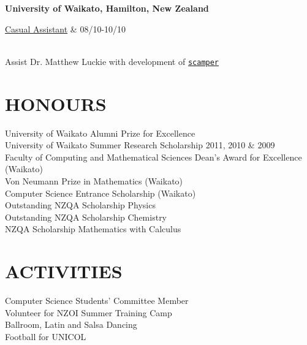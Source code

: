 \documentclass[margin,11pt]{res} %
\begin{document}
\begin{resume}
                {\bf University of Waikato, Hamilton, New Zealand} \\
                \begin{ncolumn}{2} %
                \underline{Casual Assistant} &   08/10-10/10
                \end{ncolumn} \\
                Assist Dr. Matthew Luckie with development of
                \href{http://www.wand.net.nz/scamper}{\tt{scamper}}


\section{HONOURS}
				University of Waikato Alumni Prize for Excellence \\
				University of Waikato Summer Research Scholarship 2011, 2010 \& 2009 \\
				Faculty of Computing and Mathematical Sciences Dean's Award for Excellence (Waikato) \\
				Von Neumann Prize in Mathematics (Waikato) \\
				Computer Science Entrance Scholarship (Waikato) \\
				Outstanding NZQA Scholarship Physics \\
				Outstanding NZQA Scholarship Chemistry \\
				NZQA Scholarship Mathematics with Calculus \\


\section{ACTIVITIES}
				Computer Science Students' Committee Member \\
				Volunteer for NZOI Summer Training Camp \\
				Ballroom, Latin and Salsa Dancing \\
				Football for UNICOL \\


\end{resume}
\end{document}

